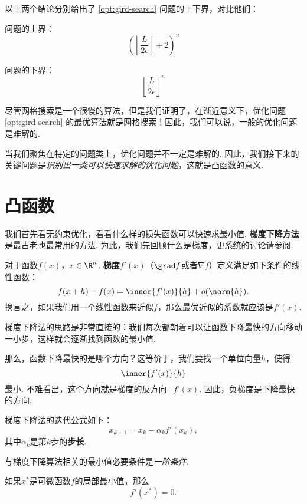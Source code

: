 以上两个结论分别给出了 \eqref{opt:gird-search} 问题的上下界，对比他们：
\begin{center}
\begin{minipage}[t]{0.4\textwidth}
问题的上界：
\[\left(\left\lfloor\frac{L}{2\epsilon}\right\rfloor+2\right)^n\]
\end{minipage}
\begin{minipage}[t]{0.4\textwidth}
问题的下界：
    \[\left\lfloor\frac{L}{2\epsilon}\right\rfloor^n\]
\end{minipage}
\end{center}
尽管网格搜索是一个很慢的算法，但是我们证明了，在渐近意义下，优化问题 \eqref{opt:gird-search} 的最优算法就是网格搜索！因此，我们可以说，一般的优化问题是难解的. 

当我们聚焦在特定的问题类上，优化问题并不一定是难解的. 因此，我们接下来的关键问题是\textit{识别出一类可以快速求解的优化问题}，这就是凸函数的意义. 


\section{凸函数}\label{sec:convex-function}

我们首先看无约束优化，看看什么样的损失函数可以快速求最小值. \textbf{梯度下降方法}是最古老也最常用的方法. 为此，我们先回顾什么是梯度，更系统的讨论请参阅.

对于函数$f(x)$，$x\in\R^n$. \textbf{梯度}$f'(x)$（$\grad f$或者$\nabla f$）定义满足如下条件的线性函数：
    \[f(x+h)-f(x)=\inner{f'(x)}{h}+o(\norm{h}).\]
换言之，如果我们用一个线性函数来近似$f$，那么最优近似的系数就应该是$f'(x)$.

梯度下降法的思路是非常直接的：我们每次都朝着可以让函数下降最快的方向移动一小步，这样就会逐渐找到函数的最小值. 

那么，函数下降最快的是哪个方向？这等价于，我们要找一个单位向量$h$，使得
\[\inner{f'(x)}{h}\]
最小. 不难看出，这个方向就是梯度的反方向$-f'(x)$. 因此，负梯度是下降最快的方向. 

梯度下降法的迭代公式如下：
\[x_{k+1}=x_k-\alpha_k f'(x_k),\]
其中$\alpha_k$是第$k$步的\textbf{步长}. 

与梯度下降算法相关的最小值必要条件是\emph{一阶条件}. 

\begin{theorem}[一阶条件]\label{thm:first-order-condition}
    如果$x^*$是可微函数$f$的局部最小值，那么
    \[f'(x^*)=0.\]
\end{theorem}

